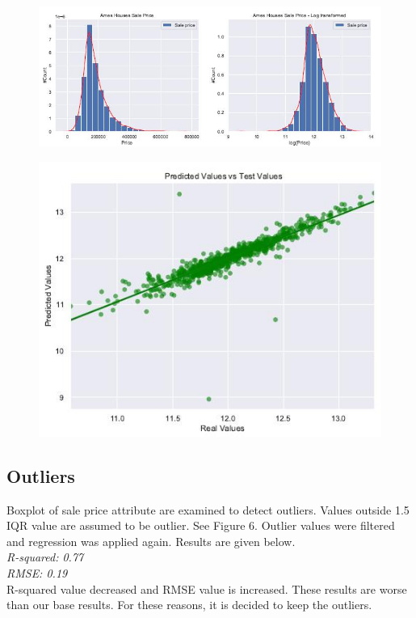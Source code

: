 \documentclass[onecolumn]{article}
\begin{document}
\begin{figure}[h]
\centering
\begin{minipage}{.6\textwidth}
  \centering
  \includegraphics[width=.9\linewidth]{distribution_2.jpg}
  \label{fig:distribution_2}
\end{minipage}%
\begin{minipage}{.4\textwidth}
  \centering
  \includegraphics[width=.9\linewidth]{non_featured.jpg}
  \label{fig:non_featured}
\end{minipage}
\end{figure}


\subsection{Outliers}
Boxplot of sale price attribute are examined to detect outliers. Values outside 1.5 IQR value are assumed to be outlier. See Figure 6. Outlier values were filtered and regression was applied again. Results are given below.\\
\textit{R-squared: 0.77\\
RMSE: 0.19}\\
R-squared value decreased and RMSE value is increased. These results are worse than our base results. For these reasons, it is decided to keep the outliers.
\end{document}
